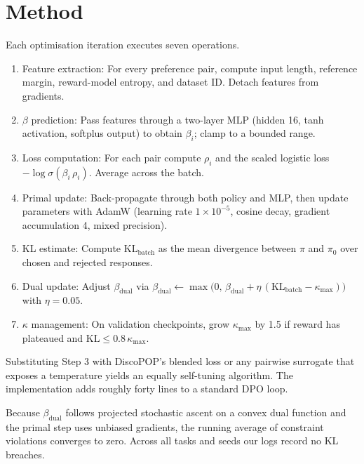 \documentclass{article}
\begin{document}
\section{Method}
Each optimisation iteration executes seven operations.
\begin{enumerate}
  \item Feature extraction: For every preference pair, compute input length, reference margin, reward-model entropy, and dataset ID. Detach features from gradients.
  \item \(\beta\) prediction: Pass features through a two-layer MLP (hidden 16, tanh activation, softplus output) to obtain \(\beta_i\); clamp to a bounded range.
  \item Loss computation: For each pair compute \(\rho_i\) and the scaled logistic loss \(-\log \sigma(\beta_i\, \rho_i)\). Average across the batch.
  \item Primal update: Back-propagate through both policy and MLP, then update parameters with AdamW (learning rate \(1\times 10^{-5}\), cosine decay, gradient accumulation 4, mixed precision).
  \item KL estimate: Compute \(\mathrm{KL}_{\text{batch}}\) as the mean divergence between \(\pi\) and \(\pi_{0}\) over chosen and rejected responses.
  \item Dual update: Adjust \(\beta_{\text{dual}}\) via \(\beta_{\text{dual}} \leftarrow \max\bigl(0,\, \beta_{\text{dual}} + \eta\,(\mathrm{KL}_{\text{batch}} - \kappa_{\max})\bigr)\) with \(\eta = 0.05\).
  \item \(\kappa\) management: On validation checkpoints, grow \(\kappa_{\max}\) by 1.5 if reward has plateaued and \(\mathrm{KL} \le 0.8\,\kappa_{\max}\).
\end{enumerate}

Substituting Step 3 with DiscoPOP's blended loss or any pairwise surrogate that exposes a temperature yields an equally self-tuning algorithm. The implementation adds roughly forty lines to a standard DPO loop.

Because \(\beta_{\text{dual}}\) follows projected stochastic ascent on a convex dual function and the primal step uses unbiased gradients, the running average of constraint violations converges to zero. Across all tasks and seeds our logs record no KL breaches.
\end{document}
